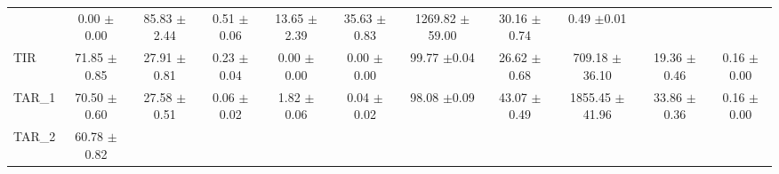 \begin{table}[htbp]
\begin{tabular}{lcccccccccc}
  & \shortstack{0.00\\\scriptsize$\pm$0.00}
  & \shortstack{85.83\\\scriptsize$\pm$2.44}
  & \shortstack{0.51\\\scriptsize$\pm$0.06}
  & \shortstack{13.65\\\scriptsize$\pm$2.39}
  & \shortstack{35.63\\\scriptsize$\pm$0.83}
  & \shortstack{1269.82\\\scriptsize$\pm$59.00}
  & \shortstack{30.16\\\scriptsize$\pm$0.74}
  & \shortstack{0.49\\\scriptsize$\pm$0.01} \\
TIR
  & \shortstack{71.85\\\scriptsize$\pm$0.85}
  & \shortstack{27.91\\\scriptsize$\pm$0.81}
  & \shortstack{0.23\\\scriptsize$\pm$0.04}
  & \shortstack{0.00\\\scriptsize$\pm$0.00}
  & \shortstack{0.00\\\scriptsize$\pm$0.00}
  & \shortstack{99.77\\\scriptsize$\pm$0.04}
  & \shortstack{26.62\\\scriptsize$\pm$0.68}
  & \shortstack{709.18\\\scriptsize$\pm$36.10}
  & \shortstack{19.36\\\scriptsize$\pm$0.46}
  & \shortstack{0.16\\\scriptsize$\pm$0.00} \\
TAR\_1
  & \shortstack{70.50\\\scriptsize$\pm$0.60}
  & \shortstack{27.58\\\scriptsize$\pm$0.51}
  & \shortstack{0.06\\\scriptsize$\pm$0.02}
  & \shortstack{1.82\\\scriptsize$\pm$0.06}
  & \shortstack{0.04\\\scriptsize$\pm$0.02}
  & \shortstack{98.08\\\scriptsize$\pm$0.09}
  & \shortstack{43.07\\\scriptsize$\pm$0.49}
  & \shortstack{1855.45\\\scriptsize$\pm$41.96}
  & \shortstack{33.86\\\scriptsize$\pm$0.36}
  & \shortstack{0.16\\\scriptsize$\pm$0.00} \\
TAR\_2
  & \shortstack{60.78\\\scriptsize$\pm$0.82}

\end{tabular}
\end{table}
